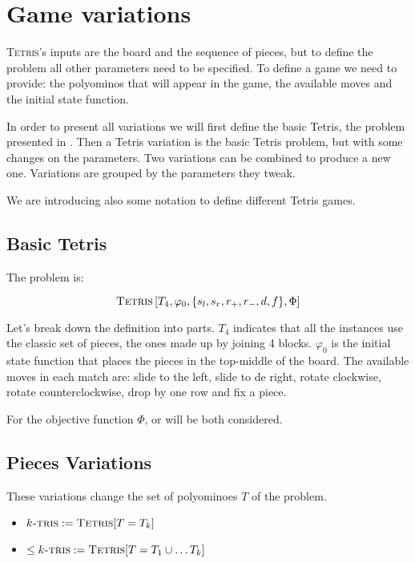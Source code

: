 \section{Game variations}

\textsc{Tetris}'s inputs are the board and the sequence of pieces, but to define the problem all other parameters need to be specified. To define a game we need to provide: the polyominos that will appear in the game, the available moves and the initial state function.

In order to present all variations we will first define the basic Tetris, the problem presented in \cite{TIH}. Then a Tetris variation is the basic Tetris problem, but with some changes on the parameters. Two variations can be combined to produce a new one. Variations are grouped by the parameters they tweak.

We are introducing also some notation to define different Tetris games. 

\subsection{Basic Tetris}

The problem is:

$$\textsc{Tetris}\left[T_4,\varphi_0, \{s_l,s_r, r_+, r_-, d, f \},\Phi \right]$$

Let's break down the definition into parts. $T_4$ indicates that all the instances use the classic set of pieces, the ones made up by joining 4 blocks. $\varphi_0$ is the initial state function that places the pieces in the top-middle of the board. The available moves in each match are: slide to the left, slide to de right, rotate clockwise, rotate counterclockwise, drop by one row and fix a piece. 

For the objective function $\Phi$, \clearing or \survival will be both considered.


\subsection{Pieces Variations}

These variations change the set of polyominoes $T$ of the problem. 

\begin{itemize}

  \item $k\textsc{-tris} := \textsc{Tetris}[T = T_k]$ 

  \item $\leq k\textsc{-tris} := \textsc{Tetris}[T = T_1 \cup \dots T_k]$

\end{itemize}

